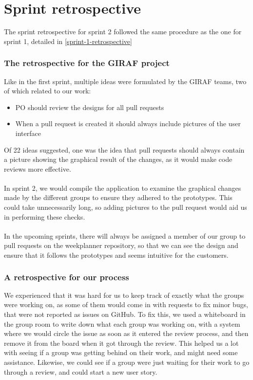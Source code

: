 \section{Sprint retrospective}\label{sec:sprint-2-retrospective}
The sprint retrospective for sprint 2 followed the same procedure as the one for sprint 1, detailed in \autoref{sprint-1-retrospective}

\subsubsection{The retrospective for the GIRAF project}
Like in the first sprint, multiple ideas were formulated by the GIRAF teams, two of which related to our work:
\begin{itemize}
    \item PO should review the designs for all pull requests
    \item When a pull request is created it should always include pictures of the user interface
\end{itemize}
\noindent
Of 22 ideas suggested, one was the idea that pull requests should always contain a picture showing the graphical result of the changes, as it would make code reviews more effective.
\\\\
In sprint 2, we would compile the application to examine the graphical changes made by the different groups to ensure they adhered to the prototypes.
This could take unnecessarily long, so adding pictures to the pull request would aid us in performing these checks.
\\\\
In the upcoming sprints, there will always be assigned a member of our group to pull requests on the weekplanner repository, so that we can see the design and ensure that it follows the prototypes and seems intuitive for the customers.

\subsubsection{A retrospective for our process}
We experienced that it was hard for us to keep track of exactly what the groups were working on, as some of them would come in with requests to fix minor bugs, that were not reported as issues on GitHub.
To fix this, we used a whiteboard in the group room to write down what each group was working on, with a system where we would circle the issue as soon as it entered the review process, and then remove it from the board when it got through the review.
This helped us a lot with seeing if a group was getting behind on their work, and might need some assistance.
Likewise, we could see if a group were just waiting for their work to go through a review, and could start a new user story.
